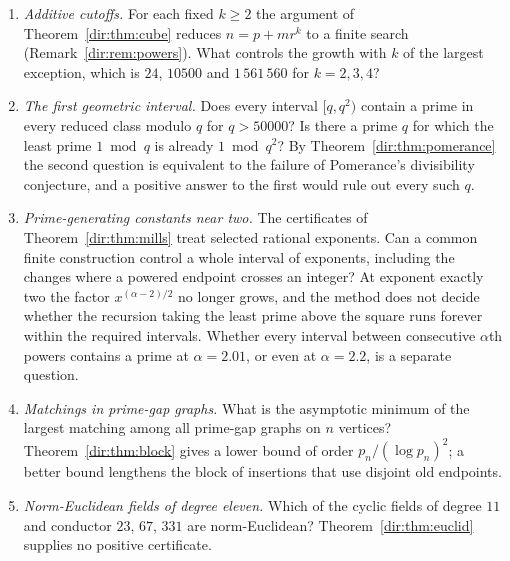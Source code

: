 \begin{enumerate}
\item \emph{Additive cutoffs.} For each fixed $k\ge2$ the argument of
 Theorem~\ref{dir:thm:cube} reduces $n=p+mr^k$ to a finite search (Remark~\ref{dir:rem:powers}).
 What controls the growth with $k$ of the largest exception, which is $24$, $10500$
 and $1\,561\,560$ for $k=2,3,4$?
\item \emph{The first geometric interval.} Does every interval $[q,q^2)$ contain a
 prime in every reduced class modulo $q$ for $q>50000$? Is there a prime $q$ for which
 the least prime $1\bmod q$ is already $1\bmod q^2$? By Theorem~\ref{dir:thm:pomerance} the
 second question is equivalent to the failure of Pomerance's divisibility conjecture,
 and a positive answer to the first would rule out every such $q$.
\item \emph{Prime-generating constants near two.} The certificates of
 Theorem~\ref{dir:thm:mills} treat selected rational exponents. Can a common finite
 construction control a whole interval of exponents, including the changes where a
 powered endpoint crosses an integer? At exponent exactly two the factor
 $x^{(\alpha-2)/2}$ no longer grows, and the method does not decide whether the
 recursion taking the least prime above the square runs forever within the required
 intervals. Whether every interval between consecutive $\alpha$th powers contains a
 prime at $\alpha=2.01$, or even at $\alpha=2.2$, is a separate question.
\item \emph{Matchings in prime-gap graphs.} What is the asymptotic minimum of the
 largest matching among all prime-gap graphs on $n$ vertices? Theorem~\ref{dir:thm:block}
 gives a lower bound of order $p_n/(\log p_n)^2$; a better bound lengthens the block of
 insertions that use disjoint old endpoints.
\item \emph{Norm-Euclidean fields of degree eleven.} Which of the cyclic fields of
 degree $11$ and conductor $23$, $67$, $331$ are norm-Euclidean?
 Theorem~\ref{dir:thm:euclid} supplies no positive certificate.
\end{enumerate}
